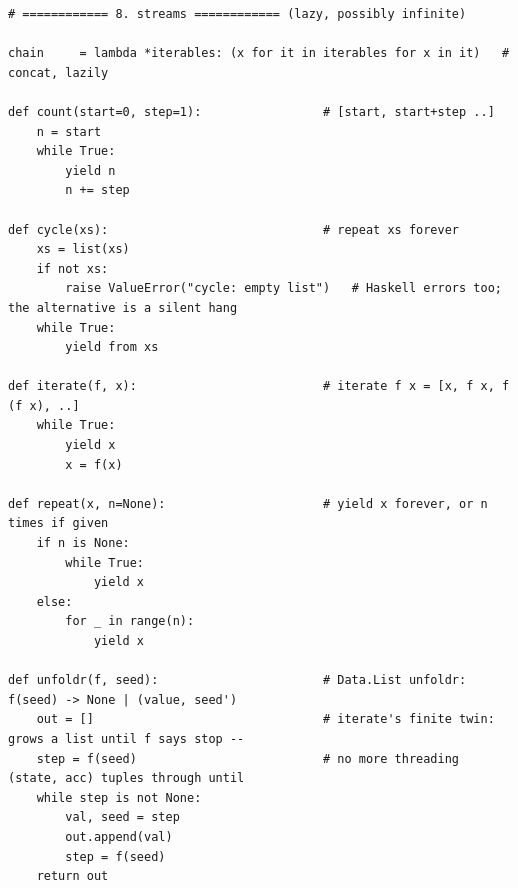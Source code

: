 \documentclass[11pt,letterpaper]{book}
\begin{document}
\begin{lstlisting}[style=code]
# ============ 8. streams ============ (lazy, possibly infinite)

chain     = lambda *iterables: (x for it in iterables for x in it)   # concat, lazily

def count(start=0, step=1):                 # [start, start+step ..]
    n = start
    while True:
        yield n
        n += step

def cycle(xs):                              # repeat xs forever
    xs = list(xs)
    if not xs:
        raise ValueError("cycle: empty list")   # Haskell errors too; the alternative is a silent hang
    while True:
        yield from xs

def iterate(f, x):                          # iterate f x = [x, f x, f (f x), ..]
    while True:
        yield x
        x = f(x)

def repeat(x, n=None):                      # yield x forever, or n times if given
    if n is None:
        while True:
            yield x
    else:
        for _ in range(n):
            yield x

def unfoldr(f, seed):                       # Data.List unfoldr: f(seed) -> None | (value, seed')
    out = []                                # iterate's finite twin: grows a list until f says stop --
    step = f(seed)                          # no more threading (state, acc) tuples through until
    while step is not None:
        val, seed = step
        out.append(val)
        step = f(seed)
    return out
\end{lstlisting}
\end{document}
